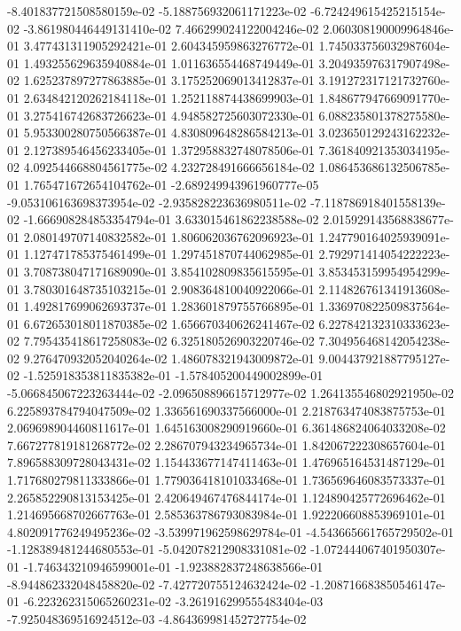 -8.401837721508580159e-02
-5.188756932061171223e-02
-6.724249615425215154e-02
-3.861980446449131410e-02
7.466299024122004246e-02
2.060308190009964846e-01
3.477431311905292421e-01
2.604345959863276772e-01
1.745033756032987604e-01
1.493255629635940884e-01
1.011636554468749449e-01
3.204935976317907498e-02
1.625237897277863885e-01
3.175252069013412837e-01
3.191272317121732760e-01
2.634842120262184118e-01
1.252118874438699903e-01
1.848677947669091770e-01
3.275416742683726623e-01
4.948582725603072330e-01
6.088235801378275580e-01
5.953300280750566387e-01
4.830809648286584213e-01
3.023650129243162232e-01
2.127389546456233405e-01
1.372958832748078506e-01
7.361840921353034195e-02
4.092544668804561775e-02
4.232728491666656184e-02
1.086453686132506785e-01
1.765471672654104762e-01
-2.689249943961960777e-05
-9.053106163698373954e-02
-2.935828223636980511e-02
-7.118786918401558139e-02
-1.666908284853354794e-01
3.633015461862238588e-02
2.015929143568838677e-01
2.080149707140832582e-01
1.806062036762096923e-01
1.247790164025939091e-01
1.127471785375461499e-01
1.297451870744062985e-01
2.792971414054222223e-01
3.708738047171689090e-01
3.854102809835615595e-01
3.853453159954954299e-01
3.780301648735103215e-01
2.908364810040922066e-01
2.114826761341913608e-01
1.492817699062693737e-01
1.283601879755766895e-01
1.336970822509837564e-01
6.672653018011870385e-02
1.656670340626241467e-02
6.227842132310333623e-02
7.795435418617258083e-02
6.325180526903220746e-02
7.304956468142054238e-02
9.276470932052040264e-02
1.486078321943009872e-01
9.004437921887795127e-02
-1.525918353811835382e-01
-1.578405200449002899e-01
-5.066845067223263444e-02
-2.096508896615712977e-02
1.264135546802921950e-02
6.225893784794047509e-02
1.336561690337566000e-01
2.218763474083875753e-01
2.069698904460811617e-01
1.645163008290919660e-01
6.361486824064033208e-02
7.667277819181268772e-02
2.286707943234965734e-01
1.842067222308657604e-01
7.896588309728043431e-02
1.154433677147411463e-01
1.476965164531487129e-01
1.717680279811333866e-01
1.779036418101033468e-01
1.736569646083573337e-01
2.265852290813153425e-01
2.420649467476844174e-01
1.124890425772696462e-01
1.214695668702667763e-01
2.585363786793083984e-01
1.922206608853969101e-01
4.802091776249495236e-02
-3.539971962598629784e-01
-4.543665661765729502e-01
-1.128389481244680553e-01
-5.042078212908331081e-02
-1.072444067401950307e-01
-1.746343210946599001e-01
-1.923882837248638566e-01
-8.944862332048458820e-02
-7.427720755124632424e-02
-1.208716683850546147e-01
-6.223262315065260231e-02
-3.261916299555483404e-03
-7.925048369516924512e-03
-4.864369981452727754e-02
